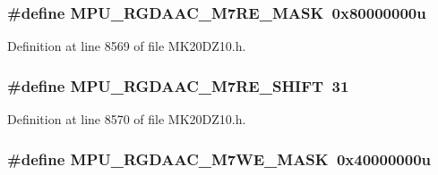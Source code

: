 \subsubsection[{\texorpdfstring{M\+P\+U\+\_\+\+R\+G\+D\+A\+A\+C\+\_\+\+M7\+R\+E\+\_\+\+M\+A\+SK}{MPU_RGDAAC_M7RE_MASK}}]{\setlength{\rightskip}{0pt plus 5cm}\#define M\+P\+U\+\_\+\+R\+G\+D\+A\+A\+C\+\_\+\+M7\+R\+E\+\_\+\+M\+A\+SK~0x80000000u}\hypertarget{group___m_p_u___register___masks_ga91e2f6e31b038f7103f4824968045be5}{}\label{group___m_p_u___register___masks_ga91e2f6e31b038f7103f4824968045be5}


Definition at line 8569 of file M\+K20\+D\+Z10.\+h.

\subsubsection[{\texorpdfstring{M\+P\+U\+\_\+\+R\+G\+D\+A\+A\+C\+\_\+\+M7\+R\+E\+\_\+\+S\+H\+I\+FT}{MPU_RGDAAC_M7RE_SHIFT}}]{\setlength{\rightskip}{0pt plus 5cm}\#define M\+P\+U\+\_\+\+R\+G\+D\+A\+A\+C\+\_\+\+M7\+R\+E\+\_\+\+S\+H\+I\+FT~31}\hypertarget{group___m_p_u___register___masks_ga2ca22b48cd61a2b77f11fd0d41b0e475}{}\label{group___m_p_u___register___masks_ga2ca22b48cd61a2b77f11fd0d41b0e475}


Definition at line 8570 of file M\+K20\+D\+Z10.\+h.

\subsubsection[{\texorpdfstring{M\+P\+U\+\_\+\+R\+G\+D\+A\+A\+C\+\_\+\+M7\+W\+E\+\_\+\+M\+A\+SK}{MPU_RGDAAC_M7WE_MASK}}]{\setlength{\rightskip}{0pt plus 5cm}\#define M\+P\+U\+\_\+\+R\+G\+D\+A\+A\+C\+\_\+\+M7\+W\+E\+\_\+\+M\+A\+SK~0x40000000u}\hypertarget{group___m_p_u___register___masks_gae26a39c4f03a041788d55172d23c277a}{}\label{group___m_p_u___register___masks_gae26a39c4f03a041788d55172d23c277a}


